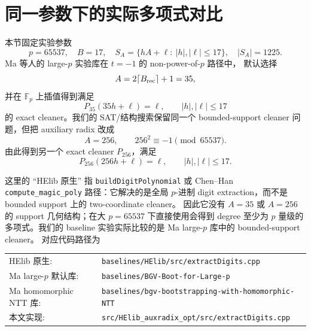 \section{同一参数下的实际多项式对比}

本节固定实验参数
\[
  p=65537,\quad B=17,\quad
  S_A=\{hA+\ell:\ |h|,|\ell|\le 17\},
  \quad |S_A|=1225.
\]
Ma 等人的 large-\(p\) 实验库在 \(t=-1\) 的 non-power-of-\(p\) 路径中，
默认选择
\[
  A=2\lceil B_{\rm rec}\rceil+1=35,
\]
并在 \(\mathbb F_p\) 上插值得到满足
\[
  P_{35}(35h+\ell)=\ell,\qquad |h|,|\ell|\le 17
\]
的 exact cleaner。我们的 SAT/结构搜索保留同一个 bounded-support
cleaner 问题，但把 auxiliary radix 改成
\[
  A=256,\qquad 256^2\equiv -1\pmod {65537}.
\]
由此得到另一个 exact cleaner \(P_{256}\)，满足
\[
  P_{256}(256h+\ell)=\ell,\qquad |h|,|\ell|\le 17.
\]

\begin{table}[h]
\centering
{}
\caption{同一 \(p=65537,B=17\) bounded-support 问题下的多项式形式。}
\end{table}

这里的 ``HElib 原生'' 指 \texttt{buildDigitPolynomial} 或 Chen--Han
\texttt{compute\_magic\_poly} 路径：它解决的是全局 \(p\)-进制 digit
extraction，而不是 bounded support 上的 two-coordinate cleaner。
因此它没有 \(A=35\) 或 \(A=256\) 的 support 几何结构；在大 \(p=65537\)
下直接使用会得到 degree 至少为 \(p\) 量级的多项式。我们的 baseline
实验实际比较的是 Ma large-\(p\) 库中的 bounded-support cleaner。
对应代码路径为
\begin{center}
\scriptsize
\begin{tabular}{ll}
HElib 原生: & \texttt{baselines/HElib/src/extractDigits.cpp}\\
Ma large-\(p\) 默认库: &
\texttt{baselines/BGV-Boot-for-Large-p}\\
Ma homomorphic NTT 库: &
\texttt{baselines/bgv-bootstrapping-with-homomorphic-NTT}\\
本文实现: &
\texttt{src/HElib\_auxradix\_opt/src/extractDigits.cpp}
\end{tabular}
\end{center}

